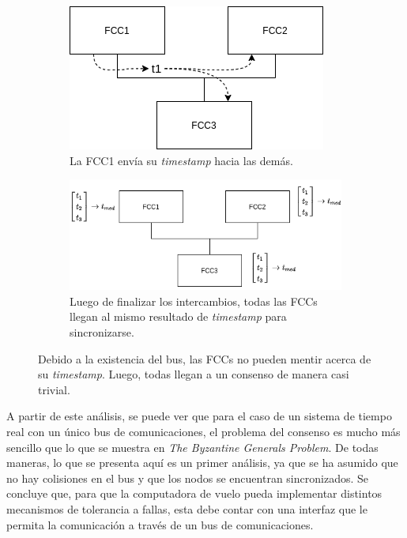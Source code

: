 \begin{figure}[H]
    \centering
    \begin{subfigure}[b]{0.34\textwidth}
        \includegraphics[width=\textwidth]{img/byzantine_bus_2.png}
        \caption{La FCC1 envía su \textit{timestamp} hacia las demás.}
        \label{fig:byzantine_bus_2}
    \end{subfigure}\hfill
    \begin{subfigure}[b]{0.49\textwidth}
        \includegraphics[width=\textwidth]{img/byzantine_bus_3.png}
        \caption{Luego de finalizar los intercambios, todas las FCCs llegan al mismo resultado de \textit{timestamp} para sincronizarse.}
        \label{fig:byzantine_bus_3}
    \end{subfigure}
    \caption{Debido a la existencia del bus, las FCCs no pueden mentir acerca de su \textit{timestamp}. Luego, todas llegan a un consenso de manera casi trivial.}
    \label{}
\end{figure}

A partir de este análisis, se puede ver que para el caso de un sistema de tiempo real con un único bus de comunicaciones, el problema del consenso es mucho más sencillo que lo que se muestra en \textit{The Byzantine Generals Problem}. De todas maneras, lo que se presenta aquí es un primer análisis, ya que se ha asumido que no hay colisiones en el bus y que los nodos se encuentran sincronizados. Se concluye que, para que la computadora de vuelo pueda implementar distintos mecanismos de tolerancia a fallas, esta debe contar con una interfaz que le permita la comunicación a través de un bus de comunicaciones.\\



